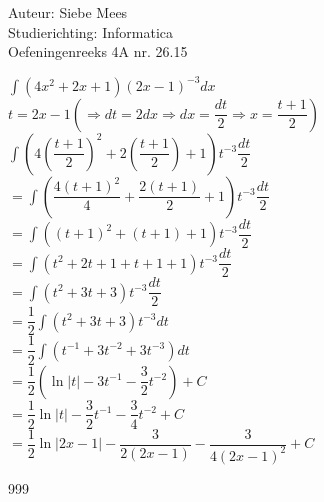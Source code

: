 \documentclass[a4paper]{article}
\begin{document}
  
\noindent \large Auteur: Siebe Mees \\
\noindent \large Studierichting: Informatica\\
\noindent \large Oefeningenreeks 4A nr. 26.15\\

\medskip

\normalsize

$\displaystyle\int (4x^2+2x+1)(2x-1)^{-3}dx$\\

$t=2x-1 \left(\Rightarrow dt=2dx \Rightarrow dx=\dfrac{dt}{2} \Rightarrow x=\dfrac{t+1}{2} \right)$\\

$\displaystyle\int \left(4\left(\dfrac{t+1}{2}\right)^2+2\left(\dfrac{t+1}{2}\right)+1\right)t^{-3}\dfrac{dt}{2}$\\

$=\displaystyle\int \left(\dfrac{4(t+1)^2}{4}+\dfrac{2(t+1)}{2}+1\right)t^{-3}\dfrac{dt}{2}$\\

$=\displaystyle\int \left((t+1)^2+(t+1)+1\right)t^{-3}\dfrac{dt}{2}$\\

$=\displaystyle\int \left(t^2+2t+1+t+1+1\right)t^{-3}\dfrac{dt}{2}$\\

$=\displaystyle\int \left(t^2+3t+3\right)t^{-3}\dfrac{dt}{2}$\\

$=\dfrac{1}{2}\displaystyle\int \left(t^2+3t+3\right)t^{-3}dt$\\

$=\dfrac{1}{2}\displaystyle\int \left(t^{-1}+3t^{-2}+3t^{-3}\right)dt$\\

$=\dfrac{1}{2}\left(\ln|t|-3t^{-1}-\dfrac{3}{2}t^{-2}\right)+C$\\

$=\dfrac{1}{2}\ln|t|-\dfrac{3}{2}t^{-1}-\dfrac{3}{4}t^{-2}+C$\\

$=\dfrac{1}{2}\ln|2x-1|-\dfrac{3}{2(2x-1)}-\dfrac{3}{4(2x-1)^2}+C$\\

\begin{thebibliography}{999}
\end{thebibliography}
\end{document}
